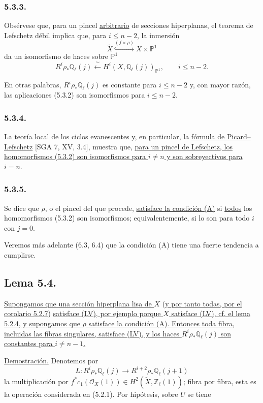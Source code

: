 \subsubsection*{5.3.3.}
Obsérvese que, para un pincel \underline{arbitrario} de secciones
hiperplanas, el teorema de Lefschetz débil implica que, para
$i\leq n-2$, la inmersión
\[
\widetilde X\overset{(f\times\rho)}{\hookrightarrow}
X\times\mathbb P^1
\]
da un isomorfismo de haces sobre $\mathbb P^1$
\[
R^i\rho_*\mathbb Q_\ell(j)
\xleftarrow{\ \sim\ }
H^i(X,\mathbb Q_\ell(j))_{\mathbb P^1},
\qquad i\leq n-2.
\]

\pageoriginale

En otras palabras, $R^i\rho_*\mathbb Q_\ell(j)$ es constante para
$i\leq n-2$ y, con mayor razón, las aplicaciones (5.3.2) son
isomorfismos para $i\leq n-2$.

\subsubsection*{5.3.4.}
La teoría local de los ciclos evanescentes y, en particular, la
\underline{fórmula de Picard--Lefschetz} [SGA 7, XV, 3.4], muestra que,
\underline{para un pincel de Lefschetz, los homomorfismos (5.3.2) son
isomorfismos para $i\ne n$ y son sobreyectivos para $i=n$}.

\subsubsection*{5.3.5.}
Se dice que $\rho$, o el pincel del que procede,
\underline{satisface la condición (A)} si \underline{todos} los
homomorfismos (5.3.2) son isomorfismos; equivalentemente, si lo son
para todo $i$ con $j=0$.

Veremos más adelante (6.3, 6.4) que la condición (A) tiene una fuerte
tendencia a cumplirse.

\subsection*{Lema 5.4.}
\underline{Supongamos que una sección hiperplana lisa de $X$} (\underline{y por
tanto todas, por el corolario 5.2.7}) \underline{satisface (LV), por ejemplo porque
$X$ satisface (LV), cf. el lema 5.2.4, y supongamos que $\rho$ satisface
la condición (A). Entonces toda fibra, incluidas las fibras singulares,
satisface (LV), y los haces $R^i\rho_*\mathbb Q_\ell(j)$ son constantes
para $i\ne n-1$.}

\noindent\underline{Demostración.}
Denotemos por
\[
L:R^i\rho_*\mathbb Q_\ell(j)
\longrightarrow R^{i+2}\rho_*\mathbb Q_\ell(j+1)
\]
la multiplicación por
$f^*c_1(\mathcal O_X(1))\in
H^2(\widetilde X,\mathbb Z_\ell(1))$; fibra por fibra, esta es la
operación considerada en (5.2.1). Por hipótesis, sobre $U$ se tiene

